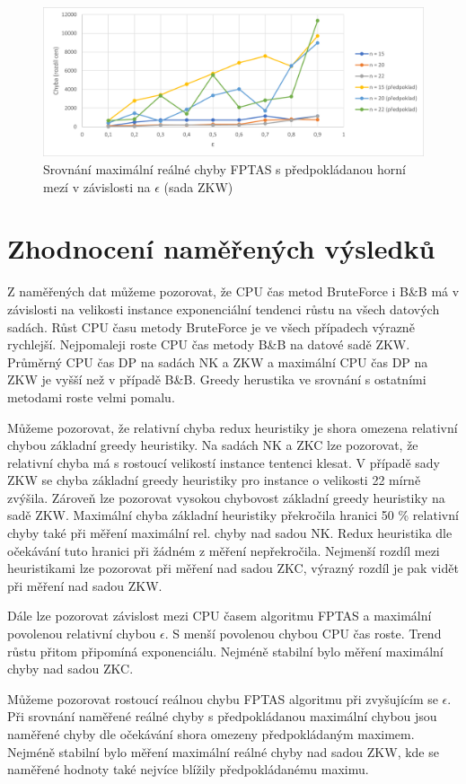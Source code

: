 \documentclass[12pt]{article}
\begin{document}
\begin{figure}[ht]\centering
    \includegraphics[width=1\textwidth, keepaspectratio]{graphs/ZKW/fptas/zkw_fptas_eps_error_comparison.png}
    \caption{Srovnání maximální reálné chyby FPTAS s předpokládanou horní mezí v závislosti na $\epsilon$ (sada ZKW)}
    \label{fig:zkw_fptas_eps_error_comparison}
\end{figure}

\section{Zhodnocení naměřených výsledků}

Z naměřených dat můžeme pozorovat, že CPU čas metod BruteForce i B\&B má v závislosti na velikosti instance exponenciální tendenci růstu na všech datových sadách. Růst CPU času metody BruteForce je ve všech případech výrazně rychlejší. Nejpomaleji roste CPU čas metody B\&B na datové sadě ZKW. Průměrný CPU čas DP na sadách NK a ZKW a maximální CPU čas DP na ZKW je vyšší než v případě B\&B. Greedy herustika ve srovnání s ostatními metodami roste velmi pomalu.

Můžeme pozorovat, že relativní chyba redux heuristiky je shora omezena relativní chybou základní greedy heuristiky. Na sadách NK a ZKC lze pozorovat, že relativní chyba má s rostoucí velikostí instance tentenci klesat. V případě sady ZKW se chyba základní greedy heuristiky pro instance o velikosti 22 mírně zvýšila. Zároveň lze pozorovat vysokou chybovost základní greedy heuristiky na sadě ZKW. Maximální chyba základní heuristiky překročila hranici 50 \% relativní chyby také při měření maximální rel. chyby nad sadou NK. Redux heuristika dle očekávání tuto hranici při žádném z měření nepřekročila. Nejmenší rozdíl mezi heuristikami lze pozorovat při měření nad sadou ZKC, výrazný rozdíl je pak vidět při měření nad sadou ZKW.

Dále lze pozorovat závislost mezi CPU časem algoritmu FPTAS a maximální povolenou relativní chybou $\epsilon$. S menší povolenou chybou CPU čas roste. Trend růstu přitom připomíná exponenciálu. Nejméně stabilní bylo měření maximální chyby nad sadou ZKC.

Můžeme pozorovat rostoucí reálnou chybu FPTAS algoritmu při zvyšujícím se $\epsilon$. Při srovnání naměřené reálné chyby s předpokládanou maximální chybou jsou naměřené chyby dle očekávání shora omezeny předpokládaným maximem. Nejméně stabilní bylo měření maximální reálné chyby nad sadou ZKW, kde se naměřené hodnoty také nejvíce blížily předpokládanému maximu.
\end{document}
